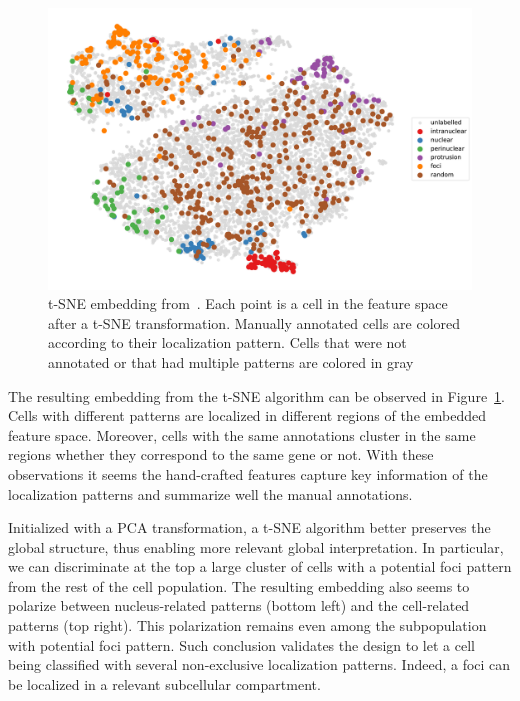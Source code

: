 \begin{figure}[]
    \centering
    \includegraphics[width=\textwidth]{figures/chapter5/tsne_annotation_legend}
    \caption[t-SNE embedding of experimental cells]{t-SNE embedding from~\cite{CHOUAIB_2020}.
	Each point is a cell in the feature space after a t-SNE transformation.
	Manually annotated cells are colored according to their localization pattern.
	Cells that were not annotated or that had multiple patterns are colored in gray}
    \label{fig:tsne_annotation_racha}
\end{figure}

The resulting embedding from the \ac{t-SNE} algorithm can be observed in Figure~\ref{fig:tsne_annotation_racha}.
Cells with different patterns are localized in different regions of the embedded feature space.
Moreover, cells with the same annotations cluster in the same regions whether they correspond to the same gene or not.
With these observations it seems the hand-crafted features capture key information of the localization patterns and summarize well the manual annotations.

Initialized with a PCA transformation, a \ac{t-SNE} algorithm better preserves the global structure, thus enabling more relevant global interpretation.
In particular, we can discriminate at the top a large cluster of cells with a potential foci pattern from the rest of the cell population.
The resulting embedding also seems to polarize between nucleus-related patterns (bottom left) and the cell-related patterns (top right).
This polarization remains even among the subpopulation with potential foci pattern.
Such conclusion validates the design to let a cell being classified with several non-exclusive localization patterns.
Indeed, a foci can be localized in a relevant subcellular compartment.

